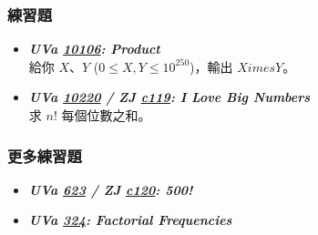 \subsubsection*{練習題}
\begin{itemize}[label={\Checkmark}]
\item \textbf{\textit{UVa \href{http://uva.onlinejudge.org/external/101/10106.html}{10106}: Product}}\\
給你 $X$、$Y$ ($0\leq{X,Y}\leq{10^{250}}$)，輸出 $X	imes{Y}$。
\item \textbf{\textit{UVa \href{http://uva.onlinejudge.org/external/102/10220.html}{10220} / ZJ \href{http://zerojudge.tw/ShowProblem?problemid=c119}{c119}: I Love Big Numbers}}\\
求 $n!$ 每個位數之和。
\end{itemize}
\subsubsection*{更多練習題}
\begin{itemize}[label={\PencilLeftDown}]
\item \textbf{\textit{UVa \href{http://uva.onlinejudge.org/external/6/623.html}{623} / ZJ \href{http://zerojudge.tw/ShowProblem?problemid=c120}{c120}: 500!}}
\item \textbf{\textit{UVa \href{http://uva.onlinejudge.org/external/3/324.html}{324}: Factorial Frequencies}}
\end{itemize}